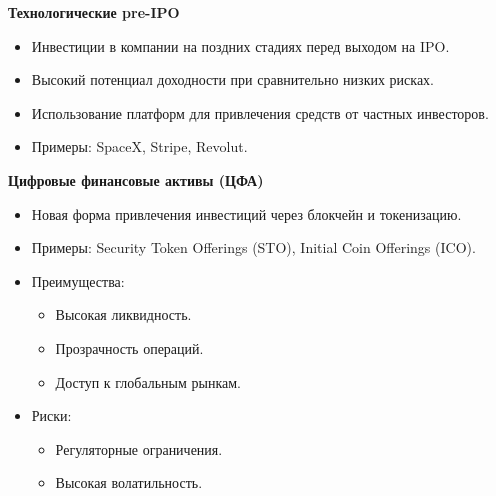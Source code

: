 \textbf{Технологические pre-IPO}
\begin{itemize}
    \item Инвестиции в компании на поздних стадиях перед выходом на IPO.
    \item Высокий потенциал доходности при сравнительно низких рисках.
    \item Использование платформ для привлечения средств от частных инвесторов.
    \item Примеры: SpaceX, Stripe, Revolut.
\end{itemize}

\textbf{Цифровые финансовые активы (ЦФА)}
\begin{itemize}
    \item Новая форма привлечения инвестиций через блокчейн и токенизацию.
    \item Примеры: Security Token Offerings (STO), Initial Coin Offerings (ICO).
    \item Преимущества:
    \begin{itemize}
        \item Высокая ликвидность.
        \item Прозрачность операций.
        \item Доступ к глобальным рынкам.
    \end{itemize}
    \item Риски:
    \begin{itemize}
        \item Регуляторные ограничения.
        \item Высокая волатильность.
    \end{itemize}
\end{itemize}
